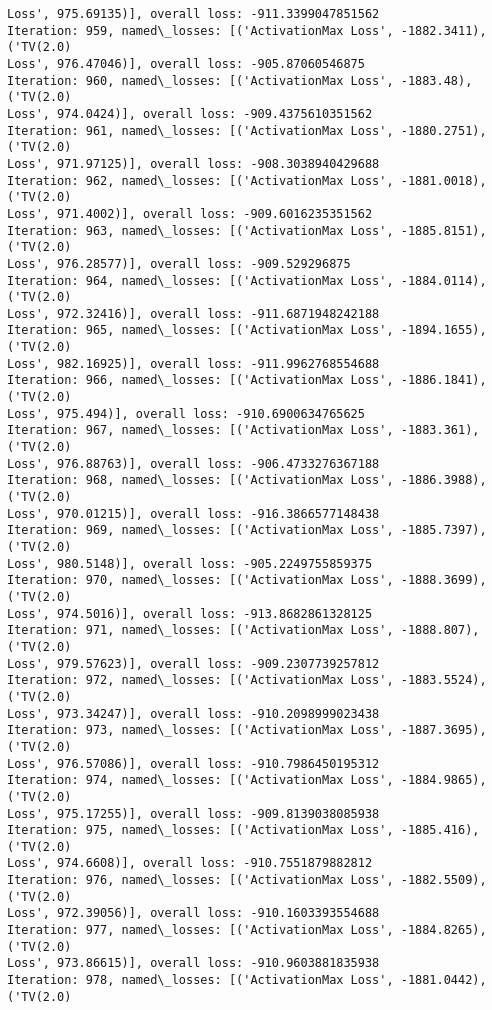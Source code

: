 \documentclass[10pt]{article}
\begin{document}
\begin{Verbatim}[commandchars=\\\{\}]
Loss', 975.69135)], overall loss: -911.3399047851562
Iteration: 959, named\_losses: [('ActivationMax Loss', -1882.3411), ('TV(2.0)
Loss', 976.47046)], overall loss: -905.87060546875
Iteration: 960, named\_losses: [('ActivationMax Loss', -1883.48), ('TV(2.0)
Loss', 974.0424)], overall loss: -909.4375610351562
Iteration: 961, named\_losses: [('ActivationMax Loss', -1880.2751), ('TV(2.0)
Loss', 971.97125)], overall loss: -908.3038940429688
Iteration: 962, named\_losses: [('ActivationMax Loss', -1881.0018), ('TV(2.0)
Loss', 971.4002)], overall loss: -909.6016235351562
Iteration: 963, named\_losses: [('ActivationMax Loss', -1885.8151), ('TV(2.0)
Loss', 976.28577)], overall loss: -909.529296875
Iteration: 964, named\_losses: [('ActivationMax Loss', -1884.0114), ('TV(2.0)
Loss', 972.32416)], overall loss: -911.6871948242188
Iteration: 965, named\_losses: [('ActivationMax Loss', -1894.1655), ('TV(2.0)
Loss', 982.16925)], overall loss: -911.9962768554688
Iteration: 966, named\_losses: [('ActivationMax Loss', -1886.1841), ('TV(2.0)
Loss', 975.494)], overall loss: -910.6900634765625
Iteration: 967, named\_losses: [('ActivationMax Loss', -1883.361), ('TV(2.0)
Loss', 976.88763)], overall loss: -906.4733276367188
Iteration: 968, named\_losses: [('ActivationMax Loss', -1886.3988), ('TV(2.0)
Loss', 970.01215)], overall loss: -916.3866577148438
Iteration: 969, named\_losses: [('ActivationMax Loss', -1885.7397), ('TV(2.0)
Loss', 980.5148)], overall loss: -905.2249755859375
Iteration: 970, named\_losses: [('ActivationMax Loss', -1888.3699), ('TV(2.0)
Loss', 974.5016)], overall loss: -913.8682861328125
Iteration: 971, named\_losses: [('ActivationMax Loss', -1888.807), ('TV(2.0)
Loss', 979.57623)], overall loss: -909.2307739257812
Iteration: 972, named\_losses: [('ActivationMax Loss', -1883.5524), ('TV(2.0)
Loss', 973.34247)], overall loss: -910.2098999023438
Iteration: 973, named\_losses: [('ActivationMax Loss', -1887.3695), ('TV(2.0)
Loss', 976.57086)], overall loss: -910.7986450195312
Iteration: 974, named\_losses: [('ActivationMax Loss', -1884.9865), ('TV(2.0)
Loss', 975.17255)], overall loss: -909.8139038085938
Iteration: 975, named\_losses: [('ActivationMax Loss', -1885.416), ('TV(2.0)
Loss', 974.6608)], overall loss: -910.7551879882812
Iteration: 976, named\_losses: [('ActivationMax Loss', -1882.5509), ('TV(2.0)
Loss', 972.39056)], overall loss: -910.1603393554688
Iteration: 977, named\_losses: [('ActivationMax Loss', -1884.8265), ('TV(2.0)
Loss', 973.86615)], overall loss: -910.9603881835938
Iteration: 978, named\_losses: [('ActivationMax Loss', -1881.0442), ('TV(2.0)

\end{Verbatim}
\end{document}
